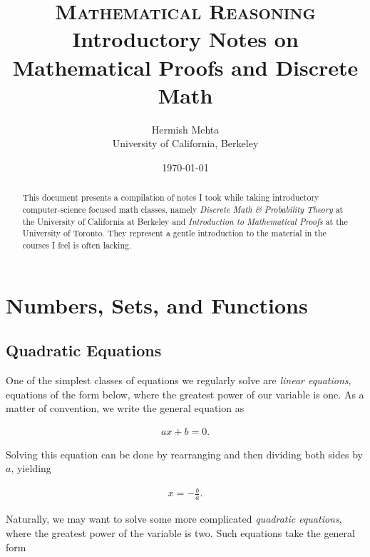 \documentclass[twoside]{report}
\begin{document}
\title{\textsc{Mathematical Reasoning} \\
	\large Introductory Notes on Mathematical Proofs and Discrete Math}
\author{Hermish Mehta \\ University of California, Berkeley}
\date{\today}
\maketitle

\begin{abstract}
	This document presents a compilation of notes I took while taking introductory computer-science focused math classes, namely \emph{Discrete Math \& Probability Theory} at the University of California at Berkeley and \emph{Introduction to Mathematical Proofs} at the University of Toronto. They represent a gentle introduction to the material in the courses I feel is often lacking.
\end{abstract}

\tableofcontents

\chapter{Numbers, Sets, and Functions}

\section{Quadratic Equations}

One of the simplest classes of equations we regularly solve are \emph{linear equations}, equations of the form below, where the greatest power of our variable is one. As a matter of convention, we write the general equation as

\begin{align}
	ax + b = 0.
\end{align}

Solving this equation can be done by rearranging and then dividing both sides by $a$, yielding

\begin{align*}
	x = -\frac{b}{a}.
\end{align*}

Naturally, we may want to solve some more complicated \emph{quadratic equations}, where the greatest power of the variable is two. Such equations take the general form
\end{document}
